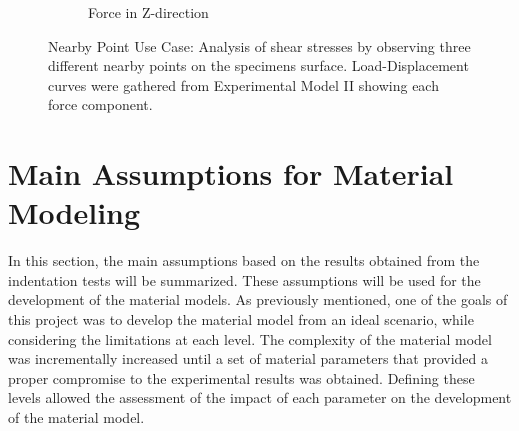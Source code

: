 \begin{figure}[htbp]
    \begin{subfigure}[b]{0.31\textwidth}
    \centering
    \caption{Force in Z-direction}
    \end{subfigure}  
    \caption{Nearby Point Use Case: Analysis of shear stresses by observing three different nearby points on the specimens surface. Load-Displacement curves were gathered from Experimental Model II showing each force component.}
    \label{fig:nbpexpIIgraph}
    \end{figure}

\section{Main Assumptions for Material Modeling}

In this section, the main assumptions based on the results obtained from 
the indentation tests will be summarized. These assumptions will be used for the 
development of the material models. As previously mentioned, one of the goals of this project 
was to develop the material model from an ideal scenario, while considering the limitations 
at each level. The complexity of the material model was incrementally increased until a set 
of material parameters that provided a proper compromise to the experimental results was obtained.
Defining these levels allowed the assessment of the impact of each parameter on the development of the 
material model.\\

